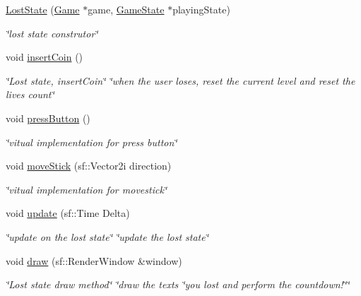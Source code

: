 \begin{DoxyCompactItemize}
\item 
\hyperlink{classLostState_a48e846ea945ff11f7bda00e71a0cfd7d}{Lost\+State} (\hyperlink{classGame}{Game} $\ast$game, \hyperlink{classGameState}{Game\+State} $\ast$playing\+State)
\begin{DoxyCompactList}\small\item\em \char`\"{}lost state construtor\char`\"{} \end{DoxyCompactList}\item 
\mbox{\label{classLostState_aa35179942033d9ab54fbcd7122f40497}} 
void \hyperlink{classLostState_aa35179942033d9ab54fbcd7122f40497}{insert\+Coin} ()
\begin{DoxyCompactList}\small\item\em \char`\"{}\+Lost state, insert\+Coin\char`\"{}  \char`\"{}when the user loses, reset the current level and reset the lives count\char`\"{} \end{DoxyCompactList}\item 
\mbox{\label{classLostState_ab0ec749961cfe909dc61289d14444a71}} 
void \hyperlink{classLostState_ab0ec749961cfe909dc61289d14444a71}{press\+Button} ()
\begin{DoxyCompactList}\small\item\em \char`\"{}vitual implementation for press button\char`\"{} \end{DoxyCompactList}\item 
\mbox{\label{classLostState_a62e42775734c1f6a7142a31fc0da3db4}} 
void \hyperlink{classLostState_a62e42775734c1f6a7142a31fc0da3db4}{move\+Stick} (sf\+::\+Vector2i direction)
\begin{DoxyCompactList}\small\item\em \char`\"{}vitual implementation for movestick\char`\"{} \end{DoxyCompactList}\item 
\mbox{\label{classLostState_aad10ee73c9033421c643ffd1b81725f2}} 
void \hyperlink{classLostState_aad10ee73c9033421c643ffd1b81725f2}{update} (sf\+::\+Time Delta)
\begin{DoxyCompactList}\small\item\em \char`\"{}update on the lost state\char`\"{}  \char`\"{}update the lost state\char`\"{} \end{DoxyCompactList}\item 
\mbox{\label{classLostState_a3168ff8040afa8313bfe5229333b7d79}} 
void \hyperlink{classLostState_a3168ff8040afa8313bfe5229333b7d79}{draw} (sf\+::\+Render\+Window \&window)
\begin{DoxyCompactList}\small\item\em \char`\"{}\+Lost state draw method\char`\"{}  \char`\"{}draw the texts \char`\"{}you lost and perform the countdown!\char`\"{}\char`\"{} \end{DoxyCompactList}\end{DoxyCompactItemize}
